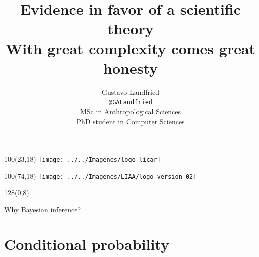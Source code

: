 \documentclass[shownotes]{beamer}
\title[Bayesian inference]{Evidence in favor of a scientific theory\\ \large With great complexity comes great honesty}
\author[Gustavo Landfried]{Gustavo Landfried \\ \scriptsize \texttt{@GALandfried} \\\vspace{0.2cm}
MSc in Anthropological Sciences \\
PhD student in Computer Sciences 
\vspace{-0.3cm}}
\institute[DC-ICC-CONICET]{\texttt{[image: ../../Imagenes/dc-logo]}}
\date{}
\begin{document}
\begin{frame}[noframenumbering]
 
 \begin{textblock}{100}(23,18)
 \texttt{[image: ../../Imagenes/logo\_licar]} 
 \end{textblock}
  \begin{textblock}{100}(74,18)
 \texttt{[image: ../../Imagenes/LIAA/logo\_version\_02]} 
 \end{textblock}

\vspace{2.5cm}
\maketitle
 
\end{frame}

\footnotesize


\begin{frame}
\begin{textblock}{128}(0,8)
\begin{center}
 \Large Why Bayesian inference?
\end{center}
\end{textblock}
\vspace{0.75cm}
 
 
\end{frame}

\section{Conditional probability}
\end{document}
